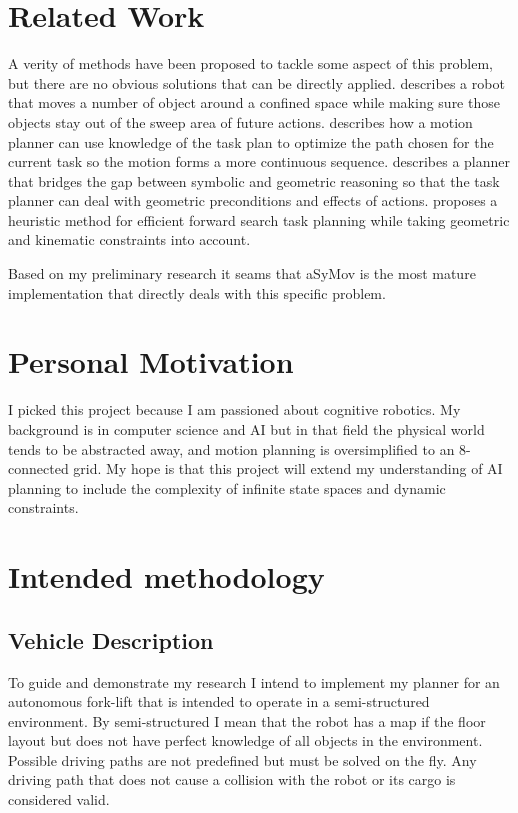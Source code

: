 \documentclass[letterpaper, 10 pt, conference]{ieeeconf}  %
\begin{document}
\label{fig}
\section{Related Work}

A verity of methods have been proposed to tackle some aspect of this problem, but there are no obvious solutions that can be directly applied. 
\cite{hpn2} describes a robot that moves a number of object around a confined space while making sure those objects stay out of the sweep area of future actions. \cite{waipointSequence} describes how a motion planner can use knowledge of the task plan to optimize the path chosen for the current task so the motion forms a more continuous sequence. \cite{asymov} describes a planner that bridges the gap between symbolic and geometric reasoning so that the task planner can deal with geometric preconditions and effects of actions. \cite{ffrob} proposes a heuristic method for efficient forward search task planning while taking geometric and kinematic constraints into account.

Based on my preliminary research it seams that aSyMov\cite{asymov}\cite{asymov2} is the most mature implementation that directly deals with this specific problem. 


\section{Personal Motivation}

I picked this project because I am passioned about cognitive robotics. My background is in computer science and AI but in that field the physical world tends to be abstracted away, and motion planning is oversimplified to an 8-connected grid. My hope is that this project will extend my understanding of AI planning to include the complexity of infinite state spaces and dynamic constraints. 


\section{Intended methodology}

\subsection{Vehicle Description}

To guide and demonstrate my research I intend to implement my planner for an autonomous fork-lift that is intended to operate in a semi-structured environment. By semi-structured I mean that the robot has a map if the floor layout but does not have perfect knowledge of all objects in the environment. Possible driving paths are not predefined but must be solved on the fly. Any driving path that does not cause a collision with the robot or its cargo is considered valid.
\end{document}
